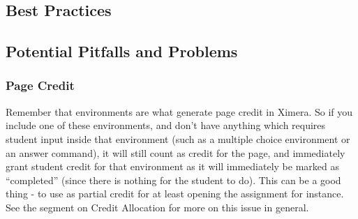 \documentclass{ximera}
\begin{document}
        \begin{paradox}
            \lipsum[1][1-3]
        \end{paradox}
        
        \begin{procedure}
            \lipsum[1][1-3]
        \end{procedure}
        
        \begin{proposition}
            \lipsum[1][1-3]
        \end{proposition}
        
        \begin{remark}
            \lipsum[1][1-3]
        \end{remark}
        
        \begin{summary}
            \lipsum[1][1-3]
        \end{summary}
        
        \begin{template}
            \lipsum[1][1-3]
        \end{template}
        
        \begin{warning}
            \lipsum[1][1-3]
        \end{warning}

    \subsection*{Best Practices}
        
        
        
    \subsection*{Potential Pitfalls and Problems}
        \subsubsection*{Page Credit}
            Remember that environments are what generate page credit in Ximera. So if you include one of these environments, and don't have anything which requires student input inside that environment (such as a multiple choice environment or an answer command), it will still count as credit for the page, and immediately grant student credit for that environment as it will immediately be marked as ``completed'' (since there is nothing for the student to do). This can be a good thing - to use as partial credit for at least opening the assignment for instance. See the segment on Credit Allocation for more on this issue in general.
\end{document}
